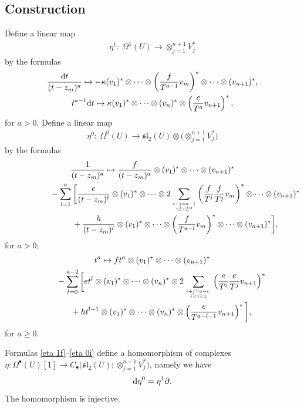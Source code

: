 \subsection{Construction}\label{sec constr}
Define a linear map
\begin{gather*}
\eta^1\colon \ \Omega^1(U)\longrightarrow \otimes_{j=1}^{n+1} V_j^*
\end{gather*}
by the formulas
\begin{gather}
\frac{{\rm d}t}{(t-z_m)^{a}} \mapsto -\kappa (v_1)^*\otimes\dots\otimes \left(\frac{f}{T^{a-1}}v_m\right)^* \otimes\dots\otimes (v_{n+1})^*, \label{eta 1f} \\
t^{a-1}{\rm d}t \mapsto \kappa (v_1)^*\otimes\dots\otimes (v_n)^* \otimes \left(\frac{e}{T^{a}}v_{n+1}\right)^*, \label{eta 1i}
\end{gather}
for $a> 0$. Define a linear map
\begin{gather*}
\eta^0\colon \ \Omega^0(U)\longrightarrow \mathfrak{sl}_2(U)\otimes \big({\otimes}_{j=1}^{n+1} V_j^*\big)
\end{gather*}
by the formulas
\begin{gather}
\frac{1}{(t-z_m)^a} \mapsto \frac{f}{(t-z_m)^a}\otimes (v_1)^*\otimes\dots\otimes (v_{n+1})^*\nonumber\\
\hphantom{\frac{1}{(t-z_m)^a} \mapsto}{} -\sum_{l=1}^a\bigg[\frac{e}{(t-z_m)^l}\otimes (v_1)^*\otimes \dots\otimes 2\sum_{i+j=a-l \atop i\geq j\geq 0} \left(\frac{f}{T^i}\frac{f}{T^j}v_m\right)^*\otimes\dots\otimes (v_{n+1})^* \nonumber \\
\hphantom{\frac{1}{(t-z_m)^a} \mapsto}{} {} +\frac{h}{(t-z_m)^l}\otimes (v_1)^*\otimes \dots\otimes \left(\frac{f}{T^{a-l}}v_m\right)^*\otimes \dots\otimes (v_{n+1})^* \bigg],\label{eta 0f}
\end{gather}
for $a>0$;
\begin{gather}
t^a \mapsto ft^a\otimes (v_1)^*\otimes\dots\otimes (v_{n+1})^*\nonumber \\
\hphantom{t^a \mapsto}{} - \sum_{l=0}^{a-2}\bigg[et^l\otimes (v_1)^*\otimes\dots\otimes
(v_n)^*\otimes 2\sum_{i+j=a-l,\atop i\geq j\geq 1} \left(\frac{e}{T^i} \frac{e}{T^j}v_{n+1}\right)^* \nonumber \\
\hphantom{t^a \mapsto}{} + ht^{l+1}\otimes (v_1)^*\otimes\dots\otimes (v_n)^*\otimes \left(\frac{e}{T^{a-l-1}}v_{n+1}\right)^* \bigg],\label{eta 0i}
\end{gather}
for $a\geq 0$.

\begin{thm}[{\cite[Theorem 5.12]{SV2}}]\label{thm hom} Formulas \eqref{eta 1f}--\eqref{eta 0i} define a homomorphism of complexes $\eta\colon \Omega^{\bullet}(U)[1] \to C_{\bullet}\big(\mathfrak{sl}_2(U);\otimes_{j=1}^{n+1} V_j^*\big)$, namely we have
\begin{gather*}%
{\rm d} \eta^0 = \eta^1\partial.
\end{gather*}
The homomorphism is injective.
\end{thm}

